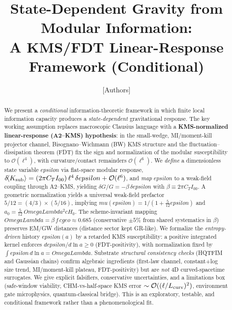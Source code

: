 \documentclass[aps,prd,onecolumn,superscriptaddress,nofootinbib]{revtex4-2}
\def\OmL{OmegaLambda}%
\def\cgeo{cgeo}%
\def\eps{epsilon}%
\def\mu{mu}%
\def\Omega_\Lambda{OmegaLambda}%
\providecommand{\OmL}{\Omega_\Lambda}
\providecommand{\cgeo}{c_{\rm geo}}
\providecommand{\eps}{\varepsilon}
\begin{document}
\title{State-Dependent Gravity from Modular Information:\\
A KMS/FDT Linear-Response Framework (Conditional)}

\author{[Authors]}
\affiliation{[Institutions]}
\date{}

\begin{abstract}
We present a \emph{conditional} information-theoretic framework in which finite local information capacity produces a \emph{state-dependent} gravitational response. The key working assumption replaces macroscopic Clausius language with a \textbf{KMS-normalized linear-response (A2--KMS) hypothesis}: in the small-wedge, MI/moment-kill projector channel, Bisognano--Wichmann (BW) KMS structure and the fluctuation--dissipation theorem (FDT) fix the sign and normalization of the modular susceptibility to \(\mathcal O(\ell^4)\), with curvature/contact remainders \(\mathcal O(\ell^6)\). We \emph{define} a dimensionless state variable \(\eps\) via flat-space modular response, \(\delta\!\langle K_{\rm sub}\rangle=(2\pi C_T I_{00})\,\ell^4\,\delta\eps+\mathcal O(\ell^6)\), and \emph{map} \(\eps\) to a weak-field coupling through A2--KMS, yielding \(\delta G/G=-\beta\,\delta\eps\) with \(\beta\equiv 2\pi C_T I_{00}\). A geometric normalization yields a universal weak-field prefactor \(5/12=(4/3)\times(5/16)\), implying \(\mu(\eps)=1/(1+\tfrac{5}{12}\eps)\) and \(a_0=\tfrac{5}{12}\,\OmL^2 cH_0\). The scheme-invariant mapping \(\OmL=\beta\,f\,\cgeo\approx 0.685\) (conservative \(\pm 5\%\) from shared systematics in \(\beta\)) preserves EM/GW distances (distance sector kept GR-like). We formalize the \emph{entropy-driven} history \(\eps(a)\) by a retarded KMS susceptibility: a positive integrated kernel enforces \(d\eps/d\ln a\ge 0\) (FDT-positivity), with normalization fixed by \(\int \eps\,d\ln a=\OmL\). Substrate \emph{structural consistency checks} (HQTFIM and Gaussian chains) confirm algebraic ingredients (first-law channel, constant+log size trend, MI/moment-kill plateau, FDT-positivity) but are \emph{not} 4D curved-spacetime surrogates. We give explicit falsifiers, conservative uncertainties, and a limitations box (safe-window viability, CHM-vs-half-space KMS error \(\sim \mathcal O((\ell/L_{\rm curv})^2)\), environment gate micro\-physics, quantum-classical bridge). This is an exploratory, testable, and conditional framework rather than a phenomenological fit.
\end{abstract}

\maketitle
\end{document}
